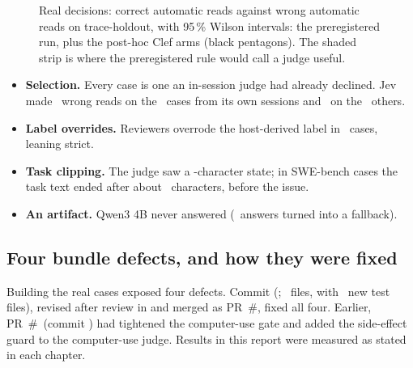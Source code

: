 \begin{figure}[htbp]
\centering

\caption{Real decisions: correct automatic reads against wrong automatic reads on trace-holdout, with 95\,\% Wilson
intervals: the preregistered run, plus the post-hoc Clef arms (black pentagons). The shaded strip is where the
preregistered rule would call a judge useful.}
\label{fig:jbreads}
\end{figure}

\begin{caution}[title={Read this before generalizing}]
\begin{itemize}[leftmargin=1.1em]
  \item \textbf{Selection.} Every case is one an in-session judge had already declined. Jev made \TrJevOwnWa\
    wrong reads on the \TrJevOwnN\ cases from its own sessions and \TrJevOtherWa\ on the \TrJevOtherN\ others.
  \item \textbf{Label overrides.} Reviewers overrode the host-derived label in \TrOverridden\ cases, leaning strict.
  \item \textbf{Task clipping.} The judge saw a \TrStateBudget-character state; in SWE-bench cases the task text
    ended after about \TrTaskSeen\ characters, before the issue.
  \item \textbf{An artifact.} Qwen3 4B never answered (\TrQwenFourAbstained\ answers turned into a fallback).
\end{itemize}
\end{caution}

\subsection{Four bundle defects, and how they were fixed}\label{sec:since}

Building the real cases exposed four defects. Commit \code{\PRFixSha} (\PRFixDate; \PRFixFiles\ files, with
\PRFixTests\ new test files), revised after review in \code{\PRFixReviewSha} and merged as PR~\#\PRFixNumber,
fixed all four. Earlier, PR~\#\SincePR\ (commit \code{\SinceCommit}) had tightened the computer-use gate and added
the side-effect guard to the computer-use judge. Results in this report were measured as stated in each chapter.

